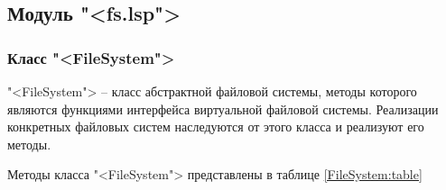 \subsection{Модуль "<fs.lsp">}

\subsubsection{Класс "<FileSystem">}

"<FileSystem"> -- класс абстрактной файловой системы, методы которого являются функциями интерфейса виртуальной файловой системы. Реализации конкретных файловых систем наследуются от этого класса и реализуют его методы.

Методы класса "<FileSystem"> представлены в таблице \ref{FileSystem:table}

\renewcommand{\arraystretch}{0.8} %

